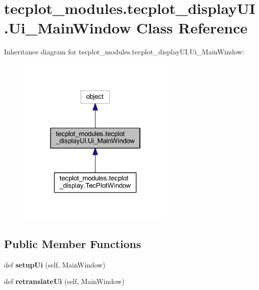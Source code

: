 \hypertarget{a00115}{}\section{tecplot\+\_\+modules.\+tecplot\+\_\+display\+U\+I.\+Ui\+\_\+\+Main\+Window Class Reference}
\label{a00115}


Inheritance diagram for tecplot\+\_\+modules.\+tecplot\+\_\+display\+U\+I.\+Ui\+\_\+\+Main\+Window\+:
\nopagebreak
\begin{figure}[H]
\begin{center}
\leavevmode
\includegraphics[width=214pt]{a00114}
\end{center}
\end{figure}
\subsection*{Public Member Functions}
\begin{DoxyCompactItemize}
\item 
\hypertarget{a00115_a84d83568b72995fc1f091c00044adb72}{}\label{a00115_a84d83568b72995fc1f091c00044adb72} 
def {\bfseries setup\+Ui} (self, Main\+Window)
\item 
\hypertarget{a00115_ae1811975426f7bbfcbe9bd6ae8a4d444}{}\label{a00115_ae1811975426f7bbfcbe9bd6ae8a4d444} 
def {\bfseries retranslate\+Ui} (self, Main\+Window)
\end{DoxyCompactItemize}
